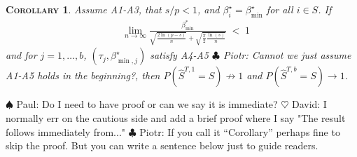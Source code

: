 \documentclass[aos]{imsart}
\theoremstyle{plain}
\newtheorem{cor}{\textsc{Corollary}}[section]
\newcommand{\david}[1]{{\small{\color{blue} \sf $\heartsuit$ David: #1}}}
\newcommand{\piotr}[1]{{\small{\color{red} \sf $\clubsuit$ Piotr: #1}}}
\newcommand{\paul}[1]{{\small{\color{green} \sf $\spadesuit$ Paul: #1}}}
\begin{document}
\begin{cor}\label{cor:selconstimpossible}
Assume A1-A3, that $s/p<1$, and $\beta^{\star}_i=\beta_{\min}^{\star}$ for all $i \in S$. If
\begin{align*}
    &\lim_{n\to \infty}\frac{\beta_{\min}^*}{\sqrt{\tfrac{2\ln(p-s)}{n}}+\sqrt{\tfrac{\pi}{2}\tfrac{\ln(s)}{n}}}\;<\; 1 
\end{align*}
and for $j=1,\ldots,b$, $(\tau_j,\beta^\star_{\min,j})$ satisfy A4-A5 \piotr{Cannot we just assume A1-A5 holds in the beginning?},
then %
$P(\hat{S}^{T,1} = S)\not \to 1$ and $P(\hat{S}^{T,b} = S)\to 1$.
\end{cor}%
\paul{Do I need to have proof or can we say it is immediate?} \david{I normally err on the cautious side and add a brief proof where I say "The result follows immediately from..."}\piotr{If you call it ``Corollary'' perhaps fine to skip the proof. But you can write a sentence below just to guide readers.}
\end{document}
